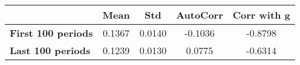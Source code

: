 \begin{tiny}\begin{tabular}{|l|c|c|c|c|}
\hline
&\textbf{Mean}&\textbf{Std}&\textbf{AutoCorr}&\textbf{Corr with g}\\\hline
\textbf{First 100 periods}&0.1367&0.0140&-0.1036&-0.8798\\\hline
\textbf{Last 100 periods}&0.1239&0.0130&0.0775&-0.6314\\\hline
\end{tabular}
\end{tiny}